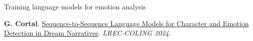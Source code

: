 \documentclass[handout,10pt]{beamer}
\begin{document}
\begin{frame}{Training language models for emotion analysis}
\vspace{0.5cm}
\scriptsize




\textbf{G. Cortal}. \href{https://aclanthology.org/2024.lrec-main.1282/}{Sequence-to-Sequence Language Models for Character and Emotion Detection in Dream Narratives}. \textit{LREC-COLING 2024}.
    
\end{frame}
\end{document}
